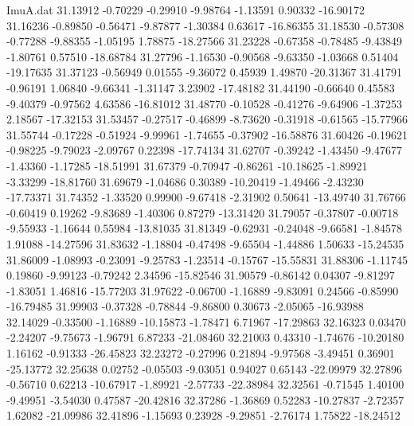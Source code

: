 \begin{filecontents}{ImuA.dat}
  31.13912   -0.70229   -0.29910   -9.98764   -1.13591    0.90332  -16.90172
  31.16236   -0.89850   -0.56471   -9.87877   -1.30384    0.63617  -16.86355
  31.18530   -0.57308   -0.77288   -9.88355   -1.05195    1.78875  -18.27566
  31.23228   -0.67358   -0.78485   -9.43849   -1.80761    0.57510  -18.68784
  31.27796   -1.16530   -0.90568   -9.63350   -1.03668    0.51404  -19.17635
  31.37123   -0.56949    0.01555   -9.36072    0.45939    1.49870  -20.31367
  31.41791   -0.96191    1.06840   -9.66341   -1.31147    3.23902  -17.48182
  31.44190   -0.66640    0.45583   -9.40379   -0.97562    4.63586  -16.81012
  31.48770   -0.10528   -0.41276   -9.64906   -1.37253    2.18567  -17.32153
  31.53457   -0.27517   -0.46899   -8.73620   -0.31918   -0.61565  -15.77966
  31.55744   -0.17228   -0.51924   -9.99961   -1.74655   -0.37902  -16.58876
  31.60426   -0.19621   -0.98225   -9.79023   -2.09767    0.22398  -17.74134
  31.62707   -0.39242   -1.43450   -9.47677   -1.43360   -1.17285  -18.51991
  31.67379   -0.70947   -0.86261  -10.18625   -1.89921   -3.33299  -18.81760
  31.69679   -1.04686    0.30389  -10.20419   -1.49466   -2.43230  -17.73371
  31.74352   -1.33520    0.99900   -9.67418   -2.31902    0.50641  -13.49740
  31.76766   -0.60419    0.19262   -9.83689   -1.40306    0.87279  -13.31420
  31.79057   -0.37807   -0.00718   -9.55933   -1.16644    0.55984  -13.81035
  31.81349   -0.62931   -0.24048   -9.66581   -1.84578    1.91088  -14.27596
  31.83632   -1.18804   -0.47498   -9.65504   -1.44886    1.50633  -15.24535
  31.86009   -1.08993   -0.23091   -9.25783   -1.23514   -0.15767  -15.55831
  31.88306   -1.11745    0.19860   -9.99123   -0.79242    2.34596  -15.82546
  31.90579   -0.86142    0.04307   -9.81297   -1.83051    1.46816  -15.77203
  31.97622   -0.06700   -1.16889   -9.83091    0.24566   -0.85990  -16.79485
  31.99903   -0.37328   -0.78844   -9.86800    0.30673   -2.05065  -16.93988
  32.14029   -0.33500   -1.16889  -10.15873   -1.78471    6.71967  -17.29863
  32.16323    0.03470   -2.24207   -9.75673   -1.96791    6.87233  -21.08460
  32.21003    0.43310   -1.74676  -10.20180    1.16162   -0.91333  -26.45823
  32.23272   -0.27996    0.21894   -9.97568   -3.49451    0.36901  -25.13772
  32.25638    0.02752   -0.05503   -9.03051    0.94027    0.65143  -22.09979
  32.27896   -0.56710    0.62213  -10.67917   -1.89921   -2.57733  -22.38984
  32.32561   -0.71545    1.40100   -9.49951   -3.54030    0.47587  -20.42816
  32.37286   -1.36869    0.52283  -10.27837   -2.72357    1.62082  -21.09986
  32.41896   -1.15693    0.23928   -9.29851   -2.76174    1.75822  -18.24512

\end{filecontents}

